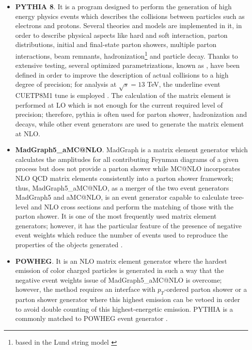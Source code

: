 \begin{itemize}

\item \textbf{PYTHIA 8}. It is a program designed to perform the generation of high energy physics events which describes the collisions between particles such as electrons and protons. Several theories and models are implemented in it, in order to describe physical aspects like hard and soft interaction, parton distributions, initial and final-state parton showers, multiple parton interactions, beam remnants, hadronization\footnote{based in the Lund string model \cite{lund}} and particle decay. Thanks to extensive testing, several optimized parametrizations, known as , have been defined in order to improve the description of actual collisions to a high degree of precision; for analysis at $\sqrt{s}=13$ TeV, the underline event CUETP8M1 tune is employed \cite{tune}.  The calculation of the matrix element is performed at LO which is not enough for the current required level of precision; therefore, pythia is often used for parton shower, hadronization and decays, while other event generators are used to generate the matrix element at NLO.
\item \textbf{MadGraph5\_aMC@NLO}. MadGraph is a matrix element generator which calculates the amplitudes for all contributing Feynman diagrams of a given process but does not provide a parton shower while MC@NLO incorporates NLO QCD matrix elements consistently into a parton shower framework; thus, MadGraph5\_aMC@NLO, as a merger of the two event generators MadGraph5 and aMC@NLO, is an event generator capable to calculate tree-level and NLO cross sections and perform the matching of those with the parton shower. It is one of the most frequently used matrix element generators; however, it has the particular feature of the presence of negative event weights which reduce the number of events used to reproduce the properties of the objects generated \cite{madgraph}.
\item \textbf{POWHEG}. It is an NLO matrix element generator where the hardest emission of color charged particles is generated in such a way that the negative event weights issue of MadGraph5\_aMC@NLO is overcome; however, the method requires an interface with  $p_T$-ordered parton shower or a parton shower generator where this highest emission can be vetoed in order to avoid double counting of this highest-energetic emission. PYTHIA is a commonly matched to POWHEG event generator \cite{powheg}.
\end{itemize}

